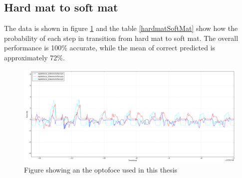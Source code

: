 \documentclass[USenglish]{ifimaster}  %
\begin{document}
\begin{table}[h]
\centering
{}
\caption{Hard mat eller gulv}
\label{my-label}
\end{table}

\FloatBarrier

\subsection{Hard mat to soft mat}
The data is shown in figure \ref{fig:hardmatSoftMat} and the table \ref{hardmatSoftMat} show how the probability of each step in transition from hard mat to soft mat. The overall performance is 100\% accurate, while the mean of correct predicted is approximately 72\%. 

\begin{figure}[h]
    \centering
    \includegraphics[width=\textwidth,height=\textheight,keepaspectratio]{Figures/MB3MM}
    \caption{Figure showing an the optofoce used in this thesis \cite{OptoforceFig}}
    \label{fig:hardmatSoftMat}
\end{figure}
\end{document}
